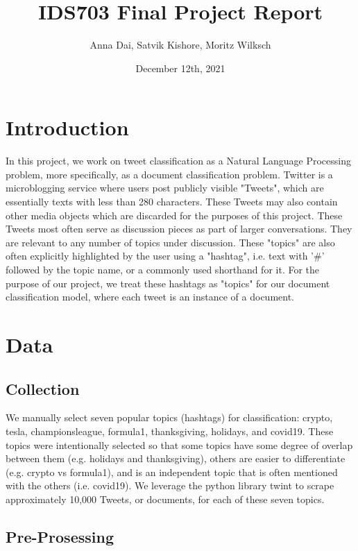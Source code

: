 \documentclass[11pt]{article}
\title{\vspace{-1.5cm}IDS703 Final Project Report}
\author{Anna Dai, Satvik Kishore, Moritz Wilksch}
\date{December 12th, 2021}
\begin{document}
\maketitle

\section{Introduction}

In this project, we work on tweet classification as a Natural Language Processing problem, more specifically, as a document classification problem. Twitter is a microblogging service where users post publicly visible "Tweets", which are essentially texts with less than 280 characters. These Tweets may also contain other media objects which are discarded for the purposes of this project. These Tweets most often serve as discussion pieces as part of larger conversations. They are relevant to any number of topics under discussion. These "topics" are also often explicitly highlighted by the user using a "hashtag", i.e. text with '\#' followed by the topic name, or a commonly used shorthand for it. For the purpose of our project, we treat these hashtags as "topics" for our document classification model, where each tweet is an instance of a document.

\section{Data}

\subsection{Collection}

We manually select seven popular topics (hashtags) for classification: crypto, tesla, championsleague, formula1, thanksgiving, holidays, and covid19.
These topics were intentionally selected so that some topics have some degree of overlap between them (e.g. holidays and thanksgiving), others are easier to differentiate (e.g. crypto vs formula1), and is an independent topic that is often mentioned with the others (i.e. covid19). We leverage the python library twint \cite{twint} to scrape approximately 10,000 Tweets, or documents, for each of these seven topics.

\subsection{Pre-Prosessing}
\end{document}

